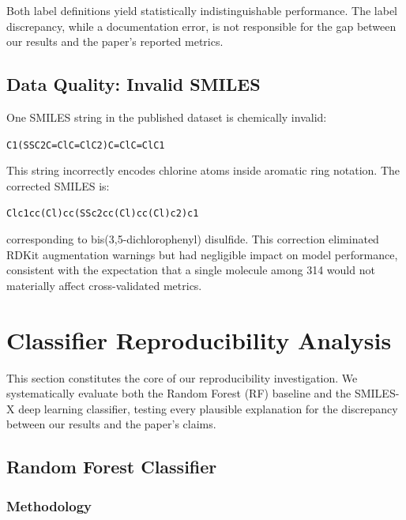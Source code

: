 \documentclass[11pt,a4paper]{article}
\begin{document}
Both label definitions yield statistically indistinguishable performance. The label discrepancy, while a documentation error, is not responsible for the gap between our results and the paper's reported metrics.

\subsection{Data Quality: Invalid SMILES}

One SMILES string in the published dataset is chemically invalid:
\begin{center}
\texttt{C1(SSC2C=ClC=ClC2)C=ClC=ClC1}
\end{center}
This string incorrectly encodes chlorine atoms inside aromatic ring notation. The corrected SMILES is:
\begin{center}
\texttt{Clc1cc(Cl)cc(SSc2cc(Cl)cc(Cl)c2)c1}
\end{center}
corresponding to bis(3,5-dichlorophenyl) disulfide. This correction eliminated RDKit augmentation warnings but had negligible impact on model performance, consistent with the expectation that a single molecule among 314 would not materially affect cross-validated metrics.

\section{Classifier Reproducibility Analysis}
\label{sec:classifiers}

This section constitutes the core of our reproducibility investigation. We systematically evaluate both the Random Forest (RF) baseline and the SMILES-X deep learning classifier, testing every plausible explanation for the discrepancy between our results and the paper's claims.

\subsection{Random Forest Classifier}
\label{sec:rf}

\subsubsection{Methodology}
\end{document}
